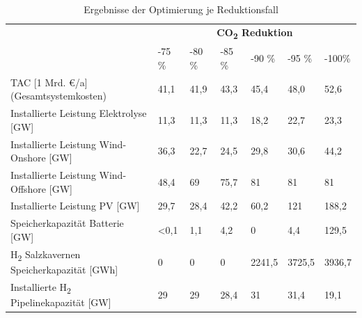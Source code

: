 \begin{table}[!h]
    \footnotesize	
    \begin{tabular}{|l|llllll|}
    \hline
     &
      \multicolumn{6}{c|}{\textbf{CO\textsubscript{2} Reduktion}} \\ \cline{2-7} 
     &
      \multicolumn{1}{l|}{-75 \%} &
      \multicolumn{1}{l|}{-80 \%} &
      \multicolumn{1}{l|}{-85 \%} &
      \multicolumn{1}{l|}{-90 \%} &
      \multicolumn{1}{l|}{-95 \%} &
      -100\% \\ \hline
    {TAC {[}1 Mrd. €/a{]} (Gesamtsystemkosten)} &
      \multicolumn{1}{l|}{41,1} &
      \multicolumn{1}{l|}{41,9} &
      \multicolumn{1}{l|}{43,3} &
      \multicolumn{1}{l|}{45,4} &
      \multicolumn{1}{l|}{48,0} &
      52,6 \\ \hline
    {Installierte Leistung Elektrolyse {[}GW{]}} &
      \multicolumn{1}{l|}{11,3} &
      \multicolumn{1}{l|}{11,3} &
      \multicolumn{1}{l|}{11,3} &
      \multicolumn{1}{l|}{18,2} &
      \multicolumn{1}{l|}{22,7} &
      23,3 \\ \hline
    {Installierte Leistung Wind-Onshore {[}GW{]}} &
      \multicolumn{1}{l|}{36,3} &
      \multicolumn{1}{l|}{22,7} &
      \multicolumn{1}{l|}{24,5} &
      \multicolumn{1}{l|}{29,8} &
      \multicolumn{1}{l|}{30,6} &
      44,2 \\ \hline
    {Installierte Leistung Wind-Offshore {[}GW{]}} &
      \multicolumn{1}{l|}{48,4} &
      \multicolumn{1}{l|}{69} &
      \multicolumn{1}{l|}{75,7} &
      \multicolumn{1}{l|}{81} &
      \multicolumn{1}{l|}{81} &
      81 \\ \hline
    {Installierte Leistung PV {[}GW{]}} &
      \multicolumn{1}{l|}{29,7} &
      \multicolumn{1}{l|}{28,4} &
      \multicolumn{1}{l|}{42,2} &
      \multicolumn{1}{l|}{60,2} &
      \multicolumn{1}{l|}{121} &
      188,2 \\ \hline
    {Speicherkapazität Batterie {[}GW{]}} &
      \multicolumn{1}{l|}{\textless{}0,1} &
      \multicolumn{1}{l|}{1,1} &
      \multicolumn{1}{l|}{4,2} &
      \multicolumn{1}{l|}{0} &
      \multicolumn{1}{l|}{4,4} &
      129,5 \\ \hline
    {H\textsubscript{2} Salzkavernen Speicherkapazität {[}GWh{]}} &
      \multicolumn{1}{l|}{0} &
      \multicolumn{1}{l|}{0} &
      \multicolumn{1}{l|}{0} &
      \multicolumn{1}{l|}{2241,5} &
      \multicolumn{1}{l|}{3725,5} &
      3936,7 \\ \hline
    {Installierte H\textsubscript{2} Pipelinekapazität {[}GW{]}} &
      \multicolumn{1}{l|}{29} &
      \multicolumn{1}{l|}{29} &
      \multicolumn{1}{l|}{28,4} &
      \multicolumn{1}{l|}{31} &
      \multicolumn{1}{l|}{31,4} &
      19,1 \\ \hline
    \end{tabular}
    \caption{Ergebnisse der Optimierung je Reduktionsfall
    }
    \label{tab:my-table}
    \end{table}

